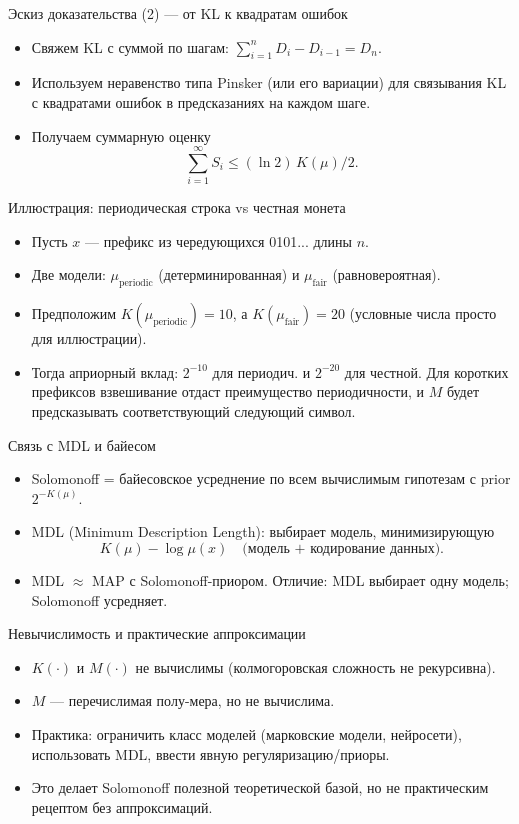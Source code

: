 \documentclass{beamer}
\begin{document}
\begin{frame}{Эскиз доказательства (2) — от KL к квадратам ошибок}
  \begin{itemize}
    \item Свяжем KL с суммой по шагам: $\sum_{i=1}^n D_i - D_{i-1} = D_n$.
    \item Используем неравенство типа Pinsker (или его вариации) для связывания KL с квадратами ошибок в предсказаниях на каждом шаге.
    \item Получаем суммарную оценку
    \[
      \sum_{i=1}^\infty S_i \le (\ln 2)\,K(\mu) / 2.
    \]
  \end{itemize}
\end{frame}

\begin{frame}{Иллюстрация: периодическая строка vs честная монета}
  \begin{itemize}
    \item Пусть $x$ — префикс из чередующихся 0101... длины $n$.
    \item Две модели: $\mu_{\text{periodic}}$ (детерминированная) и $\mu_{\text{fair}}$ (равновероятная).
    \item Предположим $K(\mu_{\text{periodic}})=10$, а $K(\mu_{\text{fair}})=20$ (условные числа просто для иллюстрации).
    \item Тогда априорный вклад: $2^{-10}$ для периодич. и $2^{-20}$ для честной. Для коротких префиксов взвешивание отдаст преимущество периодичности, и $M$ будет предсказывать соответствующий следующий символ.
  \end{itemize}
\end{frame}

\begin{frame}{Связь с MDL и байесом}
  \begin{itemize}
    \item Solomonoff = байесовское усреднение по всем вычислимым гипотезам с prior $2^{-K(\mu)}$.
    \item MDL (Minimum Description Length): выбирает модель, минимизирующую
    \[
      K(\mu) - \log\mu(x) \quad\text{(модель + кодирование данных)}.
    \]
    \item MDL $\approx$ MAP с Solomonoff-приором. Отличие: MDL выбирает одну модель; Solomonoff усредняет.
  \end{itemize}
\end{frame}

\begin{frame}{Невычислимость и практические аппроксимации}
  \begin{itemize}
    \item $K(\cdot)$ и $M(\cdot)$ не вычислимы (колмогоровская сложность не рекурсивна).
    \item $M$ — перечислимая полу-мера, но не вычислима.
    \item Практика: ограничить класс моделей (марковские модели, нейросети), использовать MDL, ввести явную регуляризацию/приоры.
    \item Это делает Solomonoff полезной теоретической базой, но не практическим рецептом без аппроксимаций.
  \end{itemize}
\end{frame}
\end{document}
